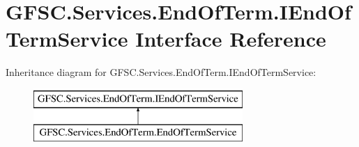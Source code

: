 \hypertarget{interface_g_f_s_c_1_1_services_1_1_end_of_term_1_1_i_end_of_term_service}{}\section{G\+F\+S\+C.\+Services.\+End\+Of\+Term.\+I\+End\+Of\+Term\+Service Interface Reference}
\label{interface_g_f_s_c_1_1_services_1_1_end_of_term_1_1_i_end_of_term_service}
Inheritance diagram for G\+F\+S\+C.\+Services.\+End\+Of\+Term.\+I\+End\+Of\+Term\+Service\+:\begin{figure}[H]
\begin{center}
\leavevmode
\includegraphics[height=2.000000cm]{interface_g_f_s_c_1_1_services_1_1_end_of_term_1_1_i_end_of_term_service}
\end{center}
\end{figure}
